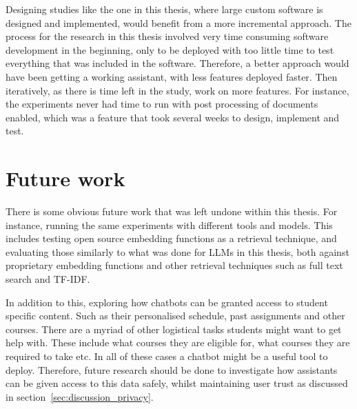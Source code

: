 Designing studies like the one in this thesis, where large custom software is designed and implemented, would benefit from a more incremental approach. The process for the research in this thesis involved very time consuming software development in the beginning, only to be deployed with too little time to test everything that was included in the software. Therefore, a better approach would have been getting a working assistant, with less features deployed faster. Then iteratively, as there is time left in the study, work on more features. For instance, the experiments never had time to run with post processing of documents enabled, which was a feature that took several weeks to design, implement and test.






\section{Future work}
\label{sec:futureWork}








There is some obvious future work that was left undone within this thesis. For instance, running the same experiments with different tools and models. This includes testing open source embedding functions as a retrieval technique, and evaluating those similarly to what was done for \gls{LLM}s in this thesis, both against proprietary embedding functions and other retrieval techniques such as full text search and \gls{TF-IDF}.


In addition to this, exploring how chatbots can be granted access to student specific content. Such as their personalised schedule, past assignments and other courses. There are a myriad of other logistical tasks students might want to get help with. These include what courses they are eligible for, what courses they are required to take etc. In all of these cases a chatbot might be a useful tool to deploy. Therefore, future research should be done to investigate how assistants can be given access to this data safely, whilst maintaining user trust as discussed in section~\ref{sec:discussion_privacy}.


